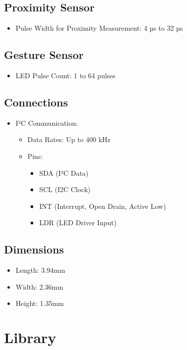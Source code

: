 \subsection*{Proximity Sensor}
\begin{itemize}
	\item Pulse Width for Proximity Measurement: 4 µs to 32 µs
\end{itemize}

\subsection*{Gesture Sensor}
\begin{itemize}
	\item LED Pulse Count: 1 to 64 pulses
\end{itemize}

\subsection*{Connections}
\begin{itemize}
	\item I²C Communication:
	\begin{itemize}
		\item Data Rates: Up to 400 kHz
		\item Pins:
		\begin{itemize}
			\item SDA (I²C Data)
			\item SCL (I2C Clock)
			\item INT (Interrupt, Open Drain, Active Low)
			\item LDR (LED Driver Input)
		\end{itemize}
	\end{itemize}
\end{itemize}

\subsection*{Dimensions}
\begin{itemize}
	\item Length: 3.94mm
	\item Width: 2.36mm
	\item Height: 1.35mm
\end{itemize}

\cite{Avago:2015}


\section{Library }

